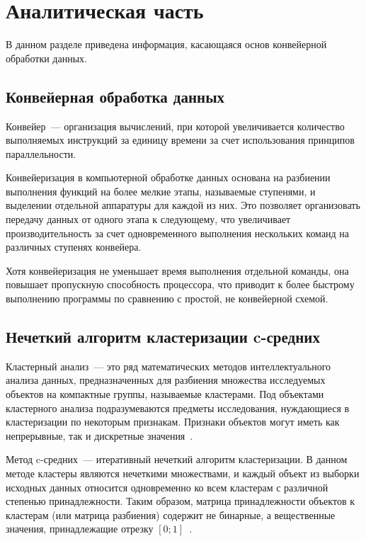 \chapter{Аналитическая часть}

В данном разделе приведена информация, касающаяся основ конвейерной обработки данных.

\section{Конвейерная обработка данных}

Конвейер~--- организация вычислений, при которой увеличивается количество выполняемых инструкций за единицу времени за счет использования принципов параллельности.

Конвейеризация в компьютерной обработке данных основана на разбиении выполнения функций на более мелкие этапы, называемые ступенями, и выделении отдельной аппаратуры для каждой из них.
Это позволяет организовать передачу данных от одного этапа к следующему, что увеличивает производительность за счет одновременного выполнения нескольких команд на различных ступенях конвейера.

Хотя конвейеризация не уменьшает время выполнения отдельной команды, она повышает пропускную способность процессора, что приводит к более быстрому выполнению программы по сравнению с простой, не конвейерной схемой.

\section{Нечеткий алгоритм кластеризации c-средних}

Кластерный анализ~--- это ряд математических методов интеллектуального анализа данных, предназначенных для разбиения множества исследуемых объектов на компактные группы, называемые кластерами. Под объектами кластерного анализа подразумеваются предметы исследования, нуждающиеся в кластеризации по некоторым признакам.
Признаки объектов могут иметь как непрерывные, так и дискретные значения~\cite{c-means}.

Метод c-средних~--- итеративный нечеткий алгоритм кластеризации.
В данном методе кластеры являются нечеткими множествами, и каждый объект из выборки исходных данных относится одновременно ко всем кластерам с различной степенью принадлежности.
Таким образом, матрица принадлежности объектов к кластерам (или матрица разбиения) содержит не бинарные, а вещественные значения, принадлежащие отрезку $[0; 1]$~\cite{c-means}.

